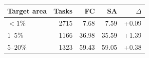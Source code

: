 \par\medskip\noindent\begin{minipage}{\linewidth}
\captionsetup{type=table}
\centering
\caption{Small-target strata in the remote queue. FC: FewClick; SA: SANSA. Dice is class-macro (\%); $\Delta$ is FC minus SA in percentage points.}
\label{tab:size}
\small
\setlength{\tabcolsep}{4pt}
\begin{tabular}{@{}lrrrr@{}}
\toprule
Target area & Tasks & FC & SA & $\Delta$ \\
\midrule
$<1\%$ & 2715 & 7.68 & 7.59 & +0.09 \\
$1$--$5\%$ & 1166 & 36.98 & 35.59 & +1.39 \\
$5$--$20\%$ & 1323 & 59.43 & 59.05 & +0.38 \\
\bottomrule
\end{tabular}
\end{minipage}\par\medskip
